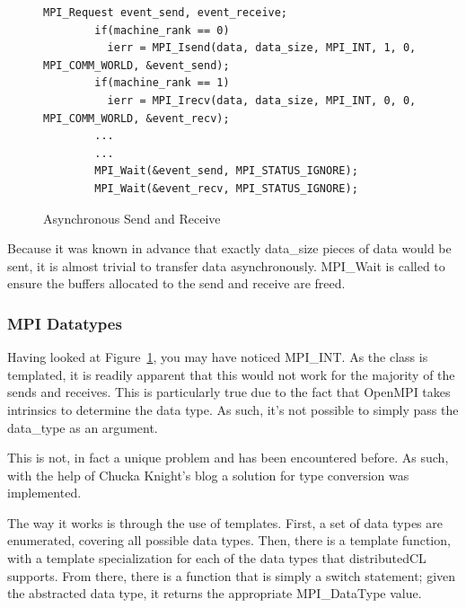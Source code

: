 \documentclass[../thesis.tex]{subfiles}
\begin{document}
    \begin{figure}[htbp]
      \centering

      \lstset{language=cpp}  
      \begin{lstlisting}[tabsize=2]
        MPI_Request event_send, event_receive;
        if(machine_rank == 0)
          ierr = MPI_Isend(data, data_size, MPI_INT, 1, 0, MPI_COMM_WORLD, &event_send);
        if(machine_rank == 1)
          ierr = MPI_Irecv(data, data_size, MPI_INT, 0, 0, MPI_COMM_WORLD, &event_recv);
        ...
        ...
        MPI_Wait(&event_send, MPI_STATUS_IGNORE);
        MPI_Wait(&event_recv, MPI_STATUS_IGNORE);

        \end{lstlisting}

      \caption{Asynchronous Send and Receive}
      \label{fig:async_send_recv}
    \end{figure}

    Because it was known in advance that exactly data\_size pieces of data would be sent, it is almost trivial to transfer data asynchronously. MPI\_Wait is called to ensure the buffers allocated to the send and receive are freed.


  \subsubsection{MPI Datatypes} %
  \label{ssub:mpi_datatypes}
    Having looked at Figure~\ref{fig:async_send_recv}, you may have noticed MPI\_INT. As the class is templated, it is readily apparent that this would not work for the majority of the sends and receives. This is particularly true due to the fact that OpenMPI takes intrinsics to determine the data type. As such, it's not possible to simply pass the data\_type as an argument.

    This is not, in fact a unique problem and has been encountered before. As such, with the help of Chucka Knight's blog\cite{chuckaknightintrinsictypeconversion} a solution for type conversion was implemented.

    The way it works is through the use of templates. First, a set of data types are enumerated, covering all possible data types. Then, there is a template function, with a template specialization for each of the data types that distributedCL supports. From there, there is a function that is simply a switch statement; given the abstracted data type, it returns the appropriate MPI\_DataType value.
\end{document}
